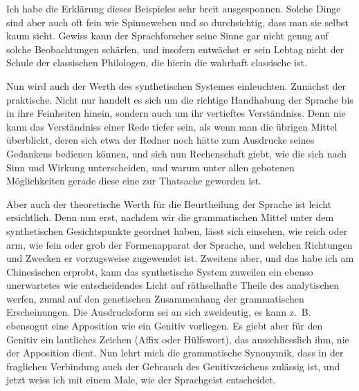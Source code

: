 Ich habe die Erklärung dieses Beispieles sehr breit ausgesponnen. Solche Dinge sind aber auch oft fein wie Spinneweben und so durchsichtig, dass man sie selbst kaum sieht. Gewiss kann der Sprachforscher seine Sinne gar nicht genug auf solche Beobachtungen schärfen, und insofern entwächst er sein Lebtag nicht der Schule der classischen Philologen, die hierin die wahrhaft classische ist.

\label{fp.100}

Nun wird auch der Werth des synthetischen Systemes einleuchten. Zunächst der praktische. Nicht nur handelt es sich um die richtige Handhabung der Sprache bis in ihre  Feinheiten hinein, sondern auch um ihr vertieftes Verständniss. Denn nie kann das Verständniss einer Rede tiefer sein, als wenn man die übrigen Mittel überblickt, deren sich etwa der Redner noch hätte zum Ausdrucke seines Gedankens bedienen können, und sich nun Rechenschaft giebt, wie die sich nach Sinn und Wirkung unterscheiden, und warum unter allen gebotenen Möglichkeiten gerade diese eine zur Thatsache geworden ist.

\label{sp.97}

Aber auch der theoretische Werth für die Beurtheilung der Sprache ist leicht ersichtlich. Denn nun erst, nachdem wir die grammatischen Mittel unter dem synthetischen Gesichtspunkte geordnet haben, lässt sich einsehen, wie reich oder arm, wie fein oder grob der Formenapparat der Sprache, und welchen Richtungen und Zwecken er vorzugsweise zugewendet ist. Zweitens aber, und das habe ich am Chinesischen erprobt, kann das synthetische System zuweilen ein ebenso unerwartetes wie entscheidendes Licht auf räthselhafte Theile des analytischen werfen, zumal auf den genetischen Zusammenhang der grammatischen Erscheinungen. Die Ausdrucksform sei an sich zweideutig, es kann z.~B. ebensogut eine Apposition wie ein Genitiv vorliegen. Es giebt aber für den Genitiv ein lautliches Zeichen (Affix oder Hülfswort), das ausschliesslich ihm, nie der Apposition dient. Nun lehrt mich die grammatische Synonymik, dass in der fraglichen Verbindung auch der Gebrauch des Genitivzeichens zulässig ist, und jetzt weiss ich mit einem Male, wie der Sprachgeist entscheidet.

